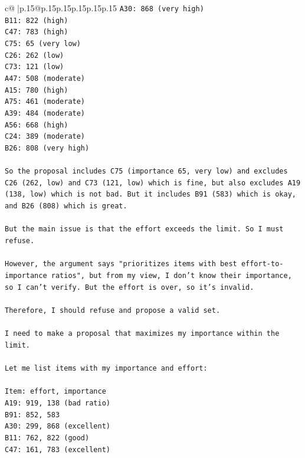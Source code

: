 \documentclass{article}
\begin{document}
{\begin{supertabular}{c@{$\;$}|p{.15\linewidth}@{}p{.15\linewidth}p{.15\linewidth}p{.15\linewidth}p{.15\linewidth}p{.15\linewidth}}
{{{\texttt{A30: 868 (very high)} \\
\texttt{B11: 822 (high)} \\
\texttt{C47: 783 (high)} \\
\texttt{C75: 65 (very low)} \\
\texttt{C26: 262 (low)} \\
\texttt{C73: 121 (low)} \\
\texttt{A47: 508 (moderate)} \\
\texttt{A15: 780 (high)} \\
\texttt{A75: 461 (moderate)} \\
\texttt{A39: 484 (moderate)} \\
\texttt{A56: 668 (high)} \\
\texttt{C24: 389 (moderate)} \\
\texttt{B26: 808 (very high)} \\
\\ 
\texttt{So the proposal includes C75 (importance 65, very low) and excludes C26 (262, low) and C73 (121, low) which is fine, but also excludes A19 (138, low) which is not bad. But it includes B91 (583) which is okay, and B26 (808) which is great.} \\
\\ 
\texttt{But the main issue is that the effort exceeds the limit. So I must refuse.} \\
\\ 
\texttt{However, the argument says "prioritizes items with best effort{-}to{-}importance ratios", but from my view, I don't know their importance, so I can't verify. But the effort is over, so it's invalid.} \\
\\ 
\texttt{Therefore, I should refuse and propose a valid set.} \\
\\ 
\texttt{I need to make a proposal that maximizes my importance within the limit.} \\
\\ 
\texttt{Let me list items with my importance and effort:} \\
\\ 
\texttt{Item: effort, importance} \\
\texttt{A19: 919, 138 (bad ratio)} \\
\texttt{B91: 852, 583} \\
\texttt{A30: 299, 868 (excellent)} \\
\texttt{B11: 762, 822 (good)} \\
\texttt{C47: 161, 783 (excellent)} \\
}}}
\end{supertabular}}
\end{document}
